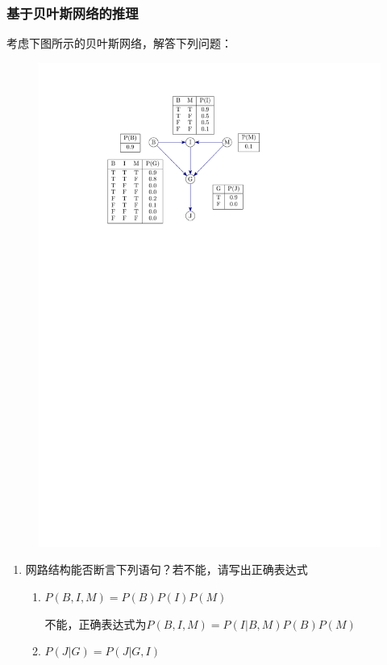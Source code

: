 \subsubsection{基于贝叶斯网络的推理}
\begin{example}
    考虑下图所示的贝叶斯网络，解答下列问题：
    \begin{figure}[htbp]
        \centering
        \includegraphics[scale = 0.8]{image/贝叶斯网络.pdf}
    \end{figure}
    \begin{enumerate}
        \item 网路结构能否断言下列语句？若不能，请写出正确表达式
        \begin{enumerate}
            \item $P(B,I,M) = P(B)P(I)P(M)$
            
            不能，正确表达式为$P(B,I,M) = P(I|B,M)P(B)P(M)$
            \item $P(J|G) = P(J|G,I)$
            

\end{enumerate}
\end{enumerate}
\end{example}
